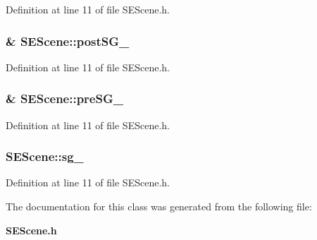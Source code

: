 Definition at line 11 of file S\+E\+Scene.\+h.

\subsubsection[{post\+S\+G\+\_\+}]{ \& S\+E\+Scene\+::post\+S\+G\+\_\+\hspace{0.3cm}{\ttfamily [protected]}}\label{class_s_e_scene_a8f570a13657cd0d6ac62f3fc40132022}


Definition at line 11 of file S\+E\+Scene.\+h.

\subsubsection[{pre\+S\+G\+\_\+}]{ \& S\+E\+Scene\+::pre\+S\+G\+\_\+\hspace{0.3cm}{\ttfamily [protected]}}\label{class_s_e_scene_a09986320f15c1c898be803060d6cefe2}


Definition at line 11 of file S\+E\+Scene.\+h.

\subsubsection[{sg\+\_\+}]{ S\+E\+Scene\+::sg\+\_\+[3]\hspace{0.3cm}{\ttfamily [protected]}}\label{class_s_e_scene_a3465bac3ffdafbb9fb34b54cae537e7d}


Definition at line 11 of file S\+E\+Scene.\+h.



The documentation for this class was generated from the following file\+:\begin{DoxyCompactItemize}
\item 
{\bf S\+E\+Scene.\+h}\end{DoxyCompactItemize}
